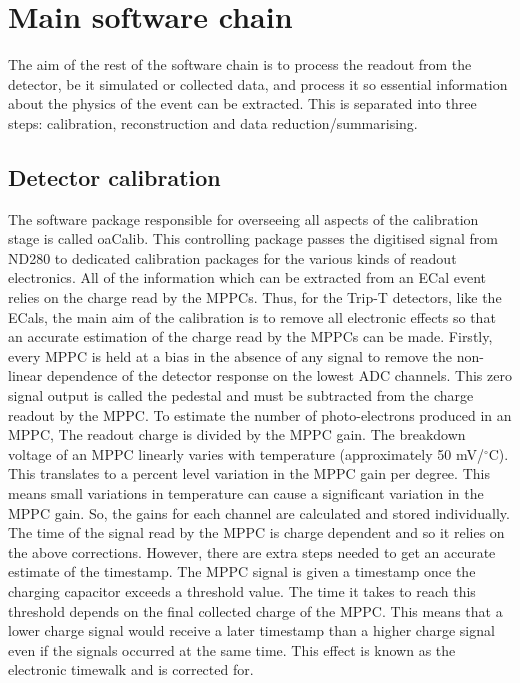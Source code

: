 \section{Main software chain}
\label{sec:mainchain}
The aim of the rest of the software chain is to process the readout from the detector, be it simulated or collected data, and process it so essential information about the physics of the event can be extracted.  This is separated into three steps: calibration, reconstruction and data reduction/summarising.


\subsection{Detector calibration}
\label{subsec:DetectorCalibration}
The software package responsible for overseeing all aspects of the calibration stage is called oaCalib.  This controlling package passes the digitised signal from ND280 to dedicated calibration packages for the various kinds of readout electronics.  All of the information which can be extracted from an ECal event relies on the charge read by the MPPCs.  Thus, for the Trip-T detectors, like the ECals, the main aim of the calibration is to remove all electronic effects so that an accurate estimation of the charge read by the MPPCs can be made.  
\newline
\newline
Firstly, every MPPC is held at a bias in the absence of any signal to remove the non-linear dependence of the detector response on the lowest ADC channels.  This zero signal output is called the pedestal and must be subtracted from the charge readout by the MPPC.  
\newline
\newline
To estimate the number of photo-electrons produced in an MPPC, The readout charge is divided by the MPPC gain.  The breakdown voltage of an MPPC linearly varies with temperature (approximately 50 mV/$^\circ$C).  This translates to a percent level variation in the MPPC gain per degree.  This means small variations in temperature can cause a significant variation in the MPPC gain.  So, the gains for each channel are calculated and stored individually.
\newline
\newline
The time of the signal read by the MPPC is charge dependent and so it relies on the above corrections.  However, there are extra steps needed to get an accurate estimate of the timestamp.  The MPPC signal is given a timestamp once the charging capacitor exceeds a threshold value.  The time it takes to reach this threshold depends on the final collected charge of the MPPC.  This means that a lower charge signal would receive a later timestamp than a higher charge signal even if the signals occurred at the same time.  This effect is known as the electronic timewalk and is corrected for.
